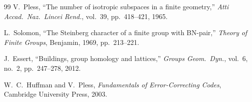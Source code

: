 \documentclass[12pt]{article}
\begin{document}
\begin{thebibliography}{99}
V.~Pless,
``The number of isotropic subspaces in a finite geometry,''
\textit{Atti Accad.\ Naz.\ Lincei Rend.}, vol.~39, pp.~418--421, 1965.

L.~Solomon,
``The Steinberg character of a finite group with BN-pair,''
\textit{Theory of Finite Groups}, Benjamin, 1969, pp.~213--221.

J.~Essert,
``Buildings, group homology and lattices,''
\textit{Groups Geom.\ Dyn.}, vol.~6, no.~2, pp.~247--278, 2012.

W.~C.~Huffman and V.~Pless,
\textit{Fundamentals of Error-Correcting Codes},
Cambridge University Press, 2003.

\end{thebibliography}
\end{document}
